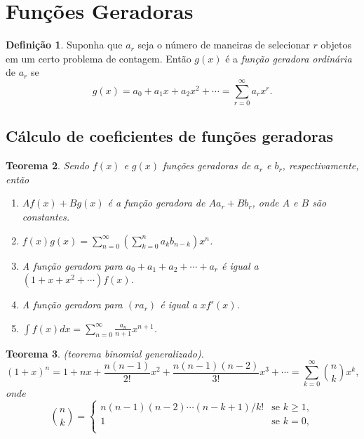 \documentclass{article}
\theoremstyle{plain}
\newtheorem{thm}{Teorema}[section]
\theoremstyle{definition}
\newtheorem{defn}[thm]{Definição}
\theoremstyle{remark}
\begin{document}
\section{Funções Geradoras}

\begin{defn}
    Suponha que \(a_r\) seja o número de maneiras de selecionar \(r\) objetos em um certo problema de contagem. Então \(g(x)\) é a \emph{função geradora ordinária} de \(a_r\) se
    \begin{equation}
        g(x) = a_0 + a_1 x + a_2 x^2 + \cdots = \sum_{r=0}^{\infty} a_r x^r.
    \end{equation}
\end{defn}

\subsection{Cálculo de coeficientes de funções geradoras}

\begin{thm} Sendo \(f(x)\) e \(g(x)\) funções geradoras de \(a_r\) e \(b_r\), respectivamente, então
    \begin{enumerate}
        \item[\textup{(a)}] \(Af(x) + Bg(x)\) é a função geradora de \(Aa_r + Bb_r\), onde \(A\) e \(B\) são constantes.
        \item[\textup{(b)}] \(\displaystyle f(x)g(x) = \sum_{n=0}^{\infty} \left( \sum_{k=0}^{n} a_k b_{n-k} \right) x^n\).
        \item[\textup{(c)}] A função geradora para \(a_0+a_1+a_2+\cdots+a_r\) é igual a \((1+x+x^2+\cdots)f(x)\).
        \item[\textup{(d)}] A função geradora para \((ra_r)\) é igual a \(xf'(x)\).
        \item[\textup{(e)}] \(\displaystyle \int f(x) dx = \sum_{n=0}^{\infty} \frac{a_n}{n+1} x^{n+1}\).
    \end{enumerate}
\end{thm}

\begin{thm} (teorema binomial generalizado).
    \begin{equation}
        (1+x)^n=1+nx+\frac{n(n-1)}{2!}x^2+\frac{n(n-1)(n-2)}{3!}x^3+\cdots = \sum_{k=0}^{\infty} \binom{n}{k} x^k,
    \end{equation}
    \noindent onde
    \[
        \binom{n}{k} = \begin{cases}
            n(n-1)(n-2)\cdots(n-k+1)/k! & \text{se } k \geq 1, \\
            1 & \text{se } k=0, \\
        \end{cases}
    \]
\end{thm}
\end{document}
